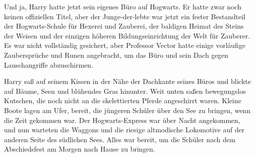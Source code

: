 Und ja, Harry hatte jetzt sein eigenes Büro auf Hogwarts. Er hatte zwar noch keinen offiziellen Titel, aber der Junge-der-lebte war jetzt ein fester Bestandteil der Hogwarts-Schule für Hexerei und Zauberei, der baldigen Heimat des Steins der Weisen und der einzigen höheren Bildungseinrichtung der Welt für Zauberer. Es war nicht vollständig gesichert, aber Professor Vector hatte einige vorläufige Zaubersprüche und Runen angebracht, um das Büro und sein Dach gegen Lauschangriffe abzuschirmen.

Harry saß auf seinem Kissen in der Nähe der Dachkante seines Büros und blickte auf Bäume, Seen und blühendes Gras hinunter. Weit unten saßen bewegungslos Kutschen, die noch nicht an die skelettierten Pferde angeschirrt waren. Kleine Boote lagen am Ufer, bereit, die jüngeren Schüler über den See zu bringen, wenn die Zeit gekommen war. Der Hogwarts-Express war über Nacht angekommen, und nun warteten die Waggons und die riesige altmodische Lokomotive auf der anderen Seite des südlichen Sees. Alles war bereit, um die Schüler nach dem Abschiedsfest am Morgen nach Hause zu bringen.

